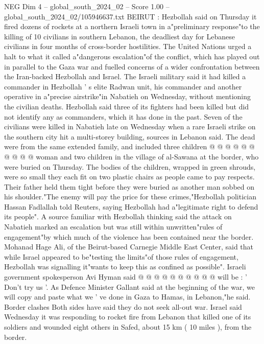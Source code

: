 \begin{textsample}{NEG Dim 4 – global\_south\_2024\_02 – Score 1.00 – global\_south\_2024\_02/105946637.txt}  \label{ex:f4_neg_387}
BEIRUT : Hezbollah said on Thursday it fired dozens of rockets at a northern Israeli town in a"preliminary response"to the killing of 10 civilians in southern Lebanon, the deadliest day for Lebanese civilians in four months of cross-border hostilities.
The United Nations urged a halt to what it called a"dangerous escalation"of the conflict, which has played out in parallel to the Gaza war and fuelled concerns of a wider confrontation between the Iran-backed Hezbollah and Israel.
The Israeli military said it had killed a commander in Hezbollah ' s elite Radwan unit, his commander and another operative in a"precise airstrike"in Nabatieh on Wednesday, without mentioning the civilian deaths.
Hezbollah said three of its fighters had been killed but did not identify any as commanders, which it has done in the past.
Seven of the civilians were killed in Nabatieh late on Wednesday when a rare Israeli strike on the southern city hit a multi-storey building, sources in Lebanon said.
The dead were from the same extended family, and included three children @ @ @ @ @ @ @ @ @ @ woman and two children in the village of al-Sawana at the border, who were buried on Thursday.
The bodies of the children, wrapped in green shrouds, were so small they each fit on two plastic chairs as people came to pay respects.
Their father held them tight before they were buried as another man sobbed on his shoulder."The enemy will pay the price for these crimes,"Hezbollah politician Hassan Fadlallah told Reuters, saying Hezbollah had a"legitimate right to defend its people".
A source familiar with Hezbollah thinking said the attack on Nabatieh marked an escalation but was still within unwritten"rules of engagement"by which much of the violence has been contained near the border.
Mohanad Hage Ali, of the Beirut-based Carnegie Middle East Center, said that while Israel appeared to be"testing the limits"of those rules of engagement, Hezbollah was signalling it"wants to keep this as confined as possible".
Israeli government spokesperson Avi Hyman said @ @ @ @ @ @ @ @ @ @ will be : ' Don't try us '.
As Defence Minister Gallant said at the beginning of the war, we will copy and paste what we ' ve done in Gaza to Hamas, in Lebanon,"he said.
Border clashes Both sides have said they do not seek all-out war.
Israel said Wednesday it was responding to rocket fire from Lebanon that killed one of its soldiers and wounded eight others in Safed, about 15 km ( 10 miles ), from the border.

\end{textsample}
